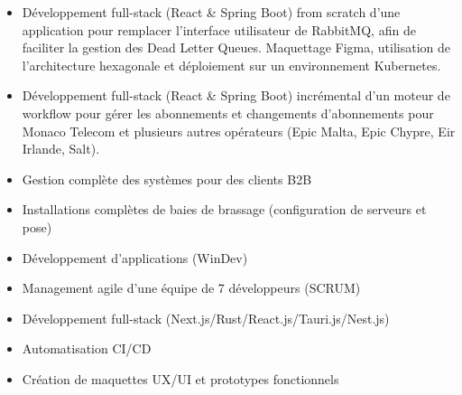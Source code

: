 \documentclass[10pt,a4paper,ragged2e,withhyper]{altacv}
\begin{document}

\makecvheader


\begin{paracol}{2}


\begin{itemize}
    \item Développement full-stack (React \& Spring Boot) from scratch d'une application pour remplacer l'interface utilisateur de RabbitMQ, afin de faciliter la gestion des Dead Letter Queues. Maquettage Figma, utilisation de l'architecture hexagonale et déploiement sur un environnement Kubernetes.
    \item Développement full-stack (React \& Spring Boot) incrémental d'un moteur de workflow pour gérer les abonnements et changements d’abonnements pour Monaco Telecom et plusieurs autres opérateurs (Epic Malta, Epic Chypre, Eir Irlande, Salt).
\end{itemize}

\divider

\begin{itemize}
    \item Gestion complète des systèmes pour des clients B2B
    \item Installations complètes de baies de brassage (configuration de serveurs et pose)
    \item Développement d'applications (WinDev)
\end{itemize}


\begin{itemize}
    \item Management agile d'une équipe de 7 développeurs (SCRUM)
    \item Développement full-stack (Next.js/Rust/React.js/Tauri.js/Nest.js)
    \item Automatisation CI/CD
    \item Création de maquettes UX/UI et prototypes fonctionnels
\end{itemize}


\end{paracol}
\end{document}
